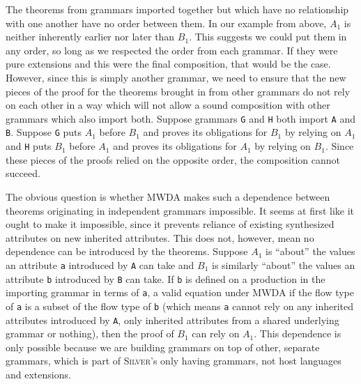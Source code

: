 \documentclass[11pt]{article}
\newcommand{\grammar}[1]{\texttt{#1}}
\newcommand{\attr}[1]{\texttt{#1}}
\newcommand{\silver}{\textsc{Silver}}
\begin{document}
The theorems from grammars imported together but which have no
relationship with one another have no order between them.  In our
example from above, $A_1$ is neither inherently earlier nor later than
$B_1$.  This suggests we could put them in any order, so long as we
respected the order from each grammar.
%
If they were pure extensions and this were the final composition, that
would be the case.  However, since this is simply another grammar, we
need to ensure that the new pieces of the proof for the theorems
brought in from other grammars do not rely on each other in a way
which will not allow a sound composition with other grammars which
also import both.
%
Suppose grammars \grammar{G} and \grammar{H} both import \grammar{A}
and \grammar{B}.  Suppose \grammar{G} puts $A_1$ before $B_1$ and
proves its obligations for $B_1$ by relying on $A_1$ and \grammar{H}
puts $B_1$ before $A_1$ and proves its obligations for $A_1$ by
relying on $B_1$.  Since these pieces of the proofs relied on the
opposite order, the composition cannot succeed.


The obvious question is whether MWDA makes such a dependence between
theorems originating in independent grammars impossible.  It seems at
first like it ought to make it impossible, since it prevents reliance
of existing synthesized attributes on new inherited attributes.  This
does not, however, mean no dependence can be introduced by the
theorems.  Suppose $A_1$ is ``about'' the values an attribute \attr{a}
introduced by \grammar{A} can take and $B_1$ is similarly ``about''
the values an attribute \attr{b} introduced by \grammar{B} can take.
If \attr{b} is defined on a production in the importing grammar in
terms of \attr{a}, a valid equation under MWDA if the flow type of
\attr{a} is a subset of the flow type of \attr{b} (which means
\attr{a} cannot rely on any inherited attributes introduced by
\grammar{A}, only inherited attributes from a shared underlying
grammar or nothing), then the proof of $B_1$ can rely on $A_1$.
%
This dependence is only possible because we are building grammars on
top of other, separate grammars, which is part of \silver{}'s only
having grammars, not host languages and extensions.
\end{document}
